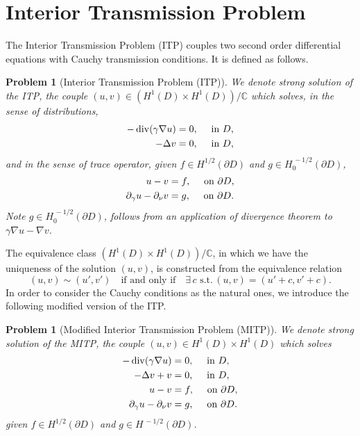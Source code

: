 \documentclass[10pt, a4paper, twoside, openright]{book}
\theoremstyle{definition}
\theoremstyle{plain}
\theoremstyle{plain}
\theoremstyle{plain}
\theoremstyle{plain}
\theoremstyle{plain}
\theoremstyle{plain}
\theoremstyle{plain}
\theoremstyle{plain}
\newtheorem{problem}[subsection]{Problem}
\DeclareMathOperator{\divergence}{div}
\begin{document}
\section{Interior Transmission Problem}
The Interior Transmission Problem (ITP) couples two second order differential equations with Cauchy transmission conditions.
It is defined as follows.
\begin{problem}[Interior Transmission Problem (ITP)]
\label{problem:ITP-dist}
We denote \emph{strong solution} of the ITP, the couple {$(u,v) \in (H^1(D) \times H^1(D))/\mathbb{C}$} which solves, in the sense of distributions,
\begin{align}
-\divergence(\gamma\nabla u) & = 0,\quad\textup{ in }D, \\
-\Delta v & = 0, \quad\textup{ in }D,
\end{align}
and in the sense of trace operator, given $f\in H^{1/2}(\partial D)$ and $g\in H^{\,-1/2}_0(\partial D)$,
\begin{align}
  u - v & = f, \quad\textup{ on }\partial D,\\
  \partial_\gamma u - \partial_\nu v & = g, \quad\textup{ on }\partial D.
\end{align}
Note $g\in H^{\,-1/2}_0(\partial D)$, follows from an application of divergence theorem to $\gamma\nabla u - \nabla v$.
\end{problem}
The equivalence class $(H^1(D) \times H^1(D))/\mathbb{C}$, in which we have the uniqueness of the solution $(u,v)$, is constructed from the equivalence relation
\begin{equation}
 (u,v)\sim(u',v') \quad \text{if and only if} \quad \exists \,c \,\,\text{s.t.}\,(u,v) = (u' + c,v' + c).
\end{equation}
In order to consider the Cauchy conditions as the natural ones, we introduce the following modified version of the ITP.
\begin{problem}[Modified Interior Transmission Problem (MITP)]
\label{problem:MITP-dist}
We denote \emph{strong solution} of the MITP, the couple {$(u,v) \in H^1(D) \times H^1(D)$} which solves
\begin{align}
-\divergence(\gamma\nabla u) & = 0,\quad\textup{ in }D, \\
-\Delta v + v & = 0, \quad\textup{ in }D, \\
  u - v & = f, \quad\textup{ on }\partial D,\\
  \partial_\gamma u - \partial_\nu v & = g, \quad\textup{ on }\partial D.
\end{align}
given $f\in H^{1/2}(\partial D)$ and $g\in H^{\,-1/2}(\partial D)$.
\end{problem}
\end{document}

